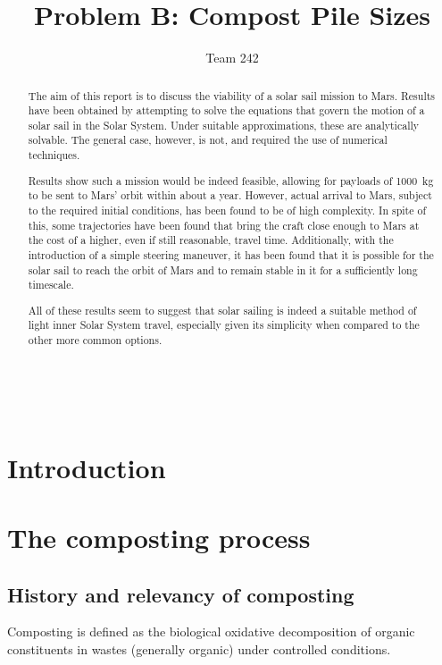 \documentclass[12pt, a4paper, twocolumn]{article}
\title{\sffamily \bfseries Problem B: Compost Pile Sizes}
\author{\sffamily Team 242}
\date{}
\numberwithin{table}{section}
\numberwithin{figure}{section}
\numberwithin{equation}{section}
\begin{document}
\renewcommand{\abstractname}{}
\renewcommand{\absnamepos}{empty}
\begin{titlingpage}
 \maketitle

\noindent \hrulefill \\
\begin{abstract}
The aim of this report is to discuss the viability of a solar sail mission to Mars. Results have been obtained by attempting to solve the equations that govern the motion of a solar sail in the Solar System. Under suitable approximations, these are analytically solvable. The general case, however, is not, and required the use of numerical techniques. 

Results show such a mission would be indeed feasible, allowing for payloads of \SI{1000}{kg} to be sent to Mars' orbit within about a year. However, actual arrival to Mars, subject to the required initial conditions, has been found to be of high complexity. In spite of this, some trajectories have been found that bring the craft close enough to Mars at the cost of a higher, even if still reasonable, travel time. Additionally, with the introduction of a simple steering maneuver, it has been found that it is possible for the solar sail to reach the orbit of Mars and to remain stable in it for a sufficiently long timescale.

All of these results seem to suggest that solar sailing is indeed a suitable method of light inner Solar System travel, especially given its simplicity when compared to the other more common options. 
\end{abstract}
\hrulefill
\end{titlingpage}

\begin{titlingpage}
\tableofcontents
\end{titlingpage}

\section{Introduction}
\cite{mason}

\section{The composting process}
\subsection{History and relevancy of composting}
Composting is defined as the biological oxidative decomposition of organic constituents in wastes (generally organic) under controlled conditions.
\end{document}
